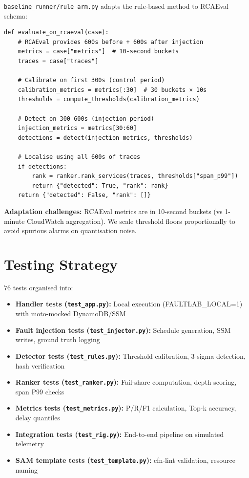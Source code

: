 \texttt{baseline\_runner/rule\_arm.py} adapts the rule-based method to RCAEval schema:

\begin{verbatim}
def evaluate_on_rcaeval(case):
    # RCAEval provides 600s before + 600s after injection
    metrics = case["metrics"]  # 10-second buckets
    traces = case["traces"]
    
    # Calibrate on first 300s (control period)
    calibration_metrics = metrics[:30]  # 30 buckets × 10s
    thresholds = compute_thresholds(calibration_metrics)
    
    # Detect on 300-600s (injection period)
    injection_metrics = metrics[30:60]
    detections = detect(injection_metrics, thresholds)
    
    # Localise using all 600s of traces
    if detections:
        rank = ranker.rank_services(traces, thresholds["span_p99"])
        return {"detected": True, "rank": rank}
    return {"detected": False, "rank": []}
\end{verbatim}

\textbf{Adaptation challenges:} RCAEval metrics are in 10-second buckets (vs 1-minute CloudWatch aggregation). We scale threshold floors proportionally to avoid spurious alarms on quantisation noise.

\section{Testing Strategy}

76 tests organised into:

\begin{itemize}
    \item \textbf{Handler tests (\texttt{test\_app.py}):} Local execution (FAULTLAB\_LOCAL=1) with moto-mocked DynamoDB/SSM
    \item \textbf{Fault injection tests (\texttt{test\_injector.py}):} Schedule generation, SSM writes, ground truth logging
    \item \textbf{Detector tests (\texttt{test\_rules.py}):} Threshold calibration, 3-sigma detection, hash verification
    \item \textbf{Ranker tests (\texttt{test\_ranker.py}):} Fail-share computation, depth scoring, span P99 checks
    \item \textbf{Metrics tests (\texttt{test\_metrics.py}):} P/R/F1 calculation, Top-k accuracy, delay quantiles
    \item \textbf{Integration tests (\texttt{test\_rig.py}):} End-to-end pipeline on simulated telemetry
    \item \textbf{SAM template tests (\texttt{test\_template.py}):} cfn-lint validation, resource naming
\end{itemize}

